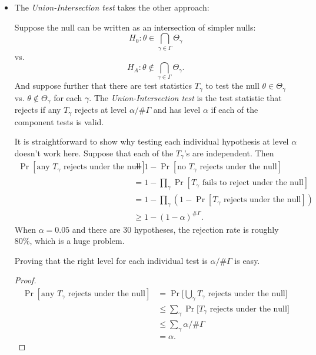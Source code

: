 \begin{itemize}[leftmargin=0pt]
\item The \emph{Union-Intersection test} takes the other approach:
  \begin{defn}
    Suppose the null can be written as an intersection of simpler
    nulls:
    \begin{equation*}
      H_0: \theta \in \bigcap_{\gamma \in \Gamma} \Theta_\gamma
    \end{equation*}
    vs.
    \begin{equation*}
      H_A: \theta \notin \bigcap_{\gamma \in \Gamma} \Theta_\gamma.
    \end{equation*}
    And suppose further that there are test statistics $T_\gamma$ to
    test the null $\theta \in \Theta_\gamma$ vs. $\theta \notin
    \Theta_\gamma$ for each $\gamma$.
    The \emph{Union-Intersection test} is the test statistic that
    rejects if any $T_\gamma$ rejects at level $\alpha / \#\Gamma$ and
    has level $\alpha$ if each of the component tests is valid.
  \end{defn}

  It is straightforward to show why testing each individual hypothesis
  at level $\alpha$ doesn't work here. Suppose that each of the
  $T_\gamma$'s are independent. Then
  \begin{align*}
    \Pr[\text{any } T_\gamma \text{ rejects under the null}]
    &= 1 - \Pr[\text{no } T_\gamma \text{ rejects under the null}] \\
    &= 1 - \prod_\gamma \Pr[T_\gamma \text{ fails to reject under the
      null}] \\
    &= 1 - \prod_\gamma (1 - \Pr[T_\gamma \text{ rejects under the
      null}]) \\
    &\geq 1 - (1 - \alpha)^{\#\Gamma}.
  \end{align*}
  When $\alpha = 0.05$ and there are 30 hypotheses, the rejection rate
  is roughly 80\%, which is a huge problem.

  Proving that the right level for each individual test is
  $\alpha/\#\Gamma$ is easy.
  \begin{proof}
    \begin{align*}
      \Pr[\text{any } T_\gamma \text{ rejects under the null}]
      &= \Pr\big[ \bigcup_\gamma T_\gamma \text{ rejects under the null}\big] \\
      &\leq \sum_\gamma \Pr\big[ T_\gamma \text{ rejects under the null}\big] \\ 
      &\leq \sum_\gamma \alpha / \# \Gamma \\
      &= \alpha.
    \end{align*}
  \end{proof}
\end{itemize}

